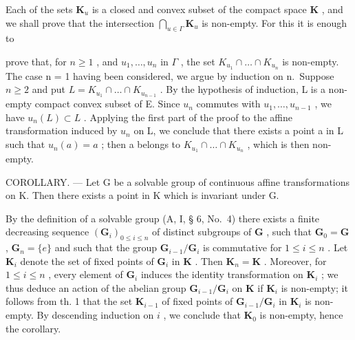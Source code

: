 Each of the sets \(\mathbf{K}_u\) is a closed and convex subset of the compact space \(\mathbf{K}\) , and we shall prove that the intersection \(\bigcap_{u\in \Gamma}\mathbf{K}_u\) is non-empty. For this it is enough to

prove that, for \(n \geqslant 1\) , and \(u_{1}, \ldots, u_{n}\) in \(\Gamma\) , the set \(K_{u_{1}} \cap \ldots \cap K_{u_{n}}\) is non-empty. The case n = 1 having been considered, we argue by induction on n.~Suppose \(n \geqslant 2\) and put \(L = K_{u_{1}} \cap \ldots \cap K_{u_{n-1}}\) . By the hypothesis of induction, L is a non-empty compact convex subset of E. Since \(u_{n}\) commutes with \(u_{1}, \ldots, u_{n-1}\) , we have \(u_{n}(L) \subset L\) . Applying the first part of the proof to the affine transformation induced by \(u_{n}\) on L, we conclude that there exists a point a in L such that \(u_{n}(a) = a\) ; then a belongs to \(K_{u_{1}} \cap \ldots \cap K_{u_{n}}\) , which is then non-empty.

COROLLARY. --- Let G be a solvable group of continuous affine transformations on K. Then there exists a point in K which is invariant under G.

By the definition of a solvable group (A, I, § 6, No.~4) there exists a finite decreasing sequence \((\mathbf{G}_i)_{0\leqslant i\leqslant n}\) of distinct subgroups of \(\mathbf{G}\) , such that \(\mathbf{G}_0 = \mathbf{G}\) , \(\mathbf{G}_n = \{e\}\) and such that the group \(\mathbf{G}_{i - 1} / \mathbf{G}_i\) is commutative for \(1\leqslant i\leqslant n\) . Let \(\mathbf{K}_i\) denote the set of fixed points of \(\mathbf{G}_i\) in \(\mathbf{K}\) . Then \(\mathbf{K}_n = \mathbf{K}\) . Moreover, for \(1\leqslant i\leqslant n\) , every element of \(\mathbf{G}_i\) induces the identity transformation on \(\mathbf{K}_i\) ; we thus deduce an action of the abelian group \(\mathbf{G}_{i - 1} / \mathbf{G}_i\) on \(\mathbf{K}\) if \(\mathbf{K}_i\) is non-empty; it follows from th. 1 that the set \(\mathbf{K}_{i - 1}\) of fixed points of \(\mathbf{G}_{i - 1} / \mathbf{G}_i\) in \(\mathbf{K}_i\) is non-empty. By descending induction on \(i\) , we conclude that \(\mathbf{K}_0\) is non-empty, hence the corollary.

